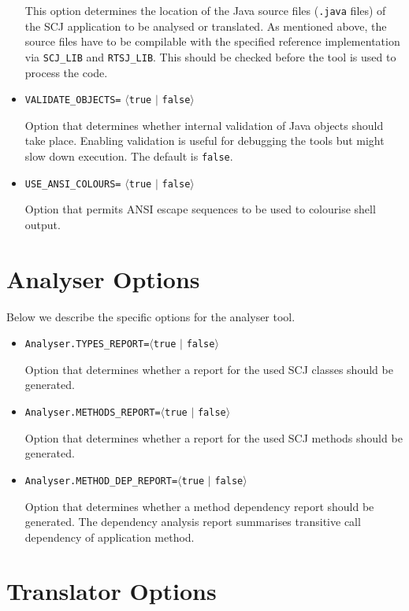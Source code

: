 \documentclass{report}
\begin{document}
\begin{itemize}
  This option determines the location of the Java source files (\verb".java" files) of the SCJ application to be analysed or translated. As mentioned above, the source files have to be compilable with the specified reference implementation via \verb"SCJ_LIB" and \verb"RTSJ_LIB". This should be checked before the tool is used to process the code.

  \item \verb"VALIDATE_OBJECTS=" $\langle$\verb"true" $|$ \verb"false"$\rangle$

  Option that determines whether internal validation of Java objects should take place. Enabling validation is useful for debugging the {\hiJAC} tools but might slow down execution. The default is \verb"false".

  \item  \verb"USE_ANSI_COLOURS=" $\langle$\verb"true" $|$ \verb"false"$\rangle$

  Option that permits ANSI escape sequences to be used to colourise shell output.
\end{itemize}

\section{Analyser Options}

Below we describe the specific options for the analyser tool.
%
\begin{itemize}
  \item \verb"Analyser.TYPES_REPORT="$\langle$\verb"true" $|$ \verb"false"$\rangle$

  Option that determines whether a report for the used SCJ classes should be generated.

  \item \verb"Analyser.METHODS_REPORT="$\langle$\verb"true" $|$ \verb"false"$\rangle$

  Option that determines whether a report for the used SCJ methods should be generated.

  \item \verb"Analyser.METHOD_DEP_REPORT="$\langle$\verb"true" $|$ \verb"false"$\rangle$

  Option that determines whether a method dependency report should be generated. The dependency analysis report summarises transitive call dependency of application method.
\end{itemize}

\section{{\Circus} Translator Options}
\end{document}
